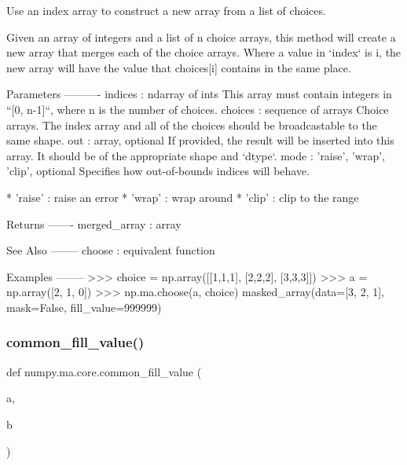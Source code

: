 \begin{DoxyVerb}Use an index array to construct a new array from a list of choices.

Given an array of integers and a list of n choice arrays, this method
will create a new array that merges each of the choice arrays.  Where a
value in `index` is i, the new array will have the value that choices[i]
contains in the same place.

Parameters
----------
indices : ndarray of ints
    This array must contain integers in ``[0, n-1]``, where n is the
    number of choices.
choices : sequence of arrays
    Choice arrays. The index array and all of the choices should be
    broadcastable to the same shape.
out : array, optional
    If provided, the result will be inserted into this array. It should
    be of the appropriate shape and `dtype`.
mode : {'raise', 'wrap', 'clip'}, optional
    Specifies how out-of-bounds indices will behave.

    * 'raise' : raise an error
    * 'wrap' : wrap around
    * 'clip' : clip to the range

Returns
-------
merged_array : array

See Also
--------
choose : equivalent function

Examples
--------
>>> choice = np.array([[1,1,1], [2,2,2], [3,3,3]])
>>> a = np.array([2, 1, 0])
>>> np.ma.choose(a, choice)
masked_array(data=[3, 2, 1],
             mask=False,
       fill_value=999999)\end{DoxyVerb}
 \mbox{\label{namespacenumpy_1_1ma_1_1core_aeae327c5f2123423bcbc7f8cab59e797}} 
\subsubsection{\texorpdfstring{common\+\_\+fill\+\_\+value()}{common\_fill\_value()}}
{\footnotesize\ttfamily def numpy.\+ma.\+core.\+common\+\_\+fill\+\_\+value (\begin{DoxyParamCaption}\item[{}]{a,  }\item[{}]{b }\end{DoxyParamCaption})}

